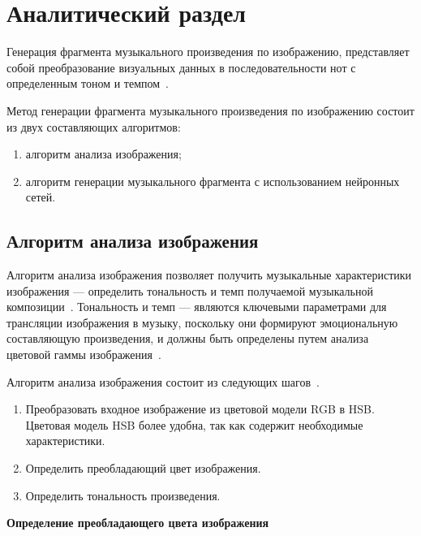 \chapter{Аналитический раздел}


Генерация фрагмента музыкального произведения по изображению, представляет собой преобразование визуальных данных в последовательности нот с определенным тоном и темпом~\cite{alg}. 

Метод генерации фрагмента музыкального произведения по изображению состоит из двух составляющих алгоритмов: 
\begin{enumerate}
	\item алгоритм анализа изображения; %
	\item алгоритм генерации музыкального фрагмента с использованием нейронных сетей.
\end{enumerate}	

\section{Алгоритм анализа изображения}

Алгоритм анализа изображения позволяет получить музыкальные характеристики изображения --- определить тональность и темп получаемой музыкальной композиции~\cite{alg}.
Тональность и темп --- являются ключевыми параметрами для трансляции изображения в музыку, поскольку они формируют эмоциональную составляющую произведения, и должны быть определены путем анализа цветовой гаммы изображения~\cite{actuality}.

Алгоритм анализа изображения состоит из следующих шагов~\cite{alg}.
\begin{enumerate}
	\item Преобразовать входное изображение из цветовой модели RGB в HSB.
	Цветовая модель HSB более удобна, так как содержит необходимые характеристики.
	\item Определить преобладающий цвет изображения.
	\item Определить тональность произведения.
\end{enumerate}

\textbf{Определение преобладающего цвета изображения}

